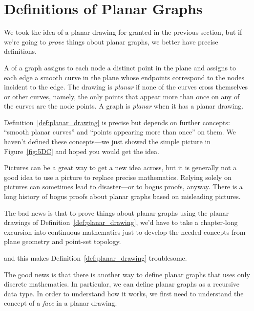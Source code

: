\section{Definitions of Planar Graphs}\label{sec:recdef_planar}

We took the idea of a planar drawing for granted in the previous
section, but if we're going to \emph{prove} things about planar graphs, we
better have precise definitions.

\begin{definition}\label{def:planar_drawing}
A  of a graph assigns to each node a distinct point in
the plane and assigns to each edge a smooth curve in the plane whose
endpoints correspond to the nodes incident to the edge.  The drawing
is \emph{planar} if none of the curves
cross themselves or other curves, namely, the only points that
appear more than once on any of the curves are the node points.  A
graph is \emph{planar} when it has a planar
drawing.
\end{definition}

Definition~\ref{def:planar_drawing} is precise but depends on
further concepts: ``smooth planar curves'' and ``points appearing more
than once'' on them.  We haven't defined these concepts---we just
showed the simple picture in Figure~\ref{fig:5DC} and hoped you would
get the idea.

Pictures can be a great way to get a new idea across, but it is generally
not a good idea to use a picture to replace precise mathematics.  Relying
solely on pictures can sometimes lead to disaster---or to bogus proofs,
anyway.  There is a long history of bogus proofs about planar graphs based
on misleading pictures.\iffalse
\footnote{The bogus proof of the
  4-Color Theorem for planar graphs is not the only example.  Mistakes
  creep in with statements like,
\begin{quote}
    As you can see from Figure~ABC, it must be that property~XYZ holds
    for all planar graphs.
\end{quote}}\fi

The bad news is that to prove things about planar graphs using the
planar drawings of Definition~\ref{def:planar_drawing}, we'd have to
take a chapter-long excursion into continuous mathematics just to
develop the needed concepts from plane geometry and point-set topology.
\begin{editingnotes} and this makes
  Definition~\ref{def:planar_drawing} troublesome.
\end{editingnotes}
The good news is that there is another way to define planar graphs that
uses only discrete mathematics.  In particular, we can define planar
graphs as a recursive data type.  In order to understand how it works, we
first need to understand the concept of a \emph{face} in a planar drawing.

